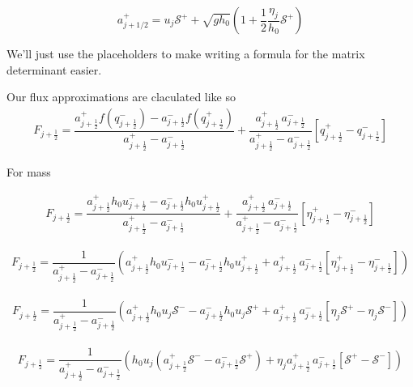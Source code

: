 \documentclass[12pt]{article}
\begin{document}
\[
a^+_{j + 1/2} = 
u_j\mathcal{S}^+  + \sqrt{gh_0}\left( 1 + \frac{1}{2}\frac{\eta_j}{h_0}\mathcal{S}^+\right) \]



We'll just use the placeholders to make writing a formula for the matrix determinant easier.

Our flux approximations are claculated like so
\begin{gather}
F_{j+\frac{1}{2}} = \dfrac{a^+_{j+\frac{1}{2}} f\left(q^-_{j+\frac{1}{2}}\right) - a^-_{j+\frac{1}{2}} f\left(q^+_{j+\frac{1}{2}}\right)}{a^+_{j+\frac{1}{2}} - a^-_{j+\frac{1}{2}}}  + \dfrac{a^+_{j+\frac{1}{2}} \, a^-_{j+\frac{1}{2}}}{a^+_{j+\frac{1}{2}} - a^-_{j+\frac{1}{2}}} \left [ q^+_{j+\frac{1}{2}} - q^-_{j+\frac{1}{2}} \right ]
\end{gather}

For mass

\begin{gather}
F_{j+\frac{1}{2}} = \dfrac{a^+_{j+\frac{1}{2}} h_0u^-_{j+\frac{1}{2}} - a^-_{j+\frac{1}{2}} h_0u^+_{j+\frac{1}{2}}}{a^+_{j+\frac{1}{2}} - a^-_{j+\frac{1}{2}}}  + \dfrac{a^+_{j+\frac{1}{2}} \, a^-_{j+\frac{1}{2}}}{a^+_{j+\frac{1}{2}} - a^-_{j+\frac{1}{2}}} \left [ \eta^+_{j+\frac{1}{2}} - \eta^-_{j+\frac{1}{2}} \right ]
\end{gather}

\begin{gather}
F_{j+\frac{1}{2}} = \dfrac{1}{a^+_{j+\frac{1}{2}} - a^-_{j+\frac{1}{2}}} \left(a^+_{j+\frac{1}{2}} h_0u^-_{j+\frac{1}{2}} - a^-_{j+\frac{1}{2}} h_0u^+_{j+\frac{1}{2}} + a^+_{j+\frac{1}{2}} \, a^-_{j+\frac{1}{2}}\left [ \eta^+_{j+\frac{1}{2}} - \eta^-_{j+\frac{1}{2}} \right ]\right) 
\end{gather}

\begin{gather}
F_{j+\frac{1}{2}} = \dfrac{1}{a^+_{j+\frac{1}{2}} - a^-_{j+\frac{1}{2}}} \left(a^+_{j+\frac{1}{2}} h_0u_{j} \mathcal{S^-} - a^-_{j+\frac{1}{2}} h_0u_{j} \mathcal{S^+} + a^+_{j+\frac{1}{2}} \, a^-_{j+\frac{1}{2}}\left [ \eta_{j}\mathcal{S^+} - \eta_{j}\mathcal{S^-} \right ]\right) 
\end{gather}

\begin{gather}
F_{j+\frac{1}{2}} = \dfrac{1}{a^+_{j+\frac{1}{2}} - a^-_{j+\frac{1}{2}}} \left(h_0 u_j \left(a^+_{j+\frac{1}{2}} \mathcal{S^-} - a^-_{j+\frac{1}{2}} \mathcal{S^+} \right) + \eta_{j} a^+_{j+\frac{1}{2}} \, a^-_{j+\frac{1}{2}}\left [ \mathcal{S^+} -\mathcal{S^-} \right ]\right) 
\end{gather}
\end{document}
